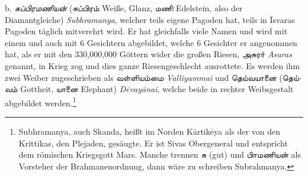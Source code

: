 \documentclass{article}
\newcommand{\TamilText}[1]{\texttamil{#1}}
\newcommand{\TamilItalic}[1]{\texttamil{\emph{#1}}}
\newcommand{\TamilHead}[1]{\TamilItalic{#1}}
\newcommand{\TamilEtymon}[1]{\TamilText{#1}}
\newcommand{\Translit}[1]{\emph{#1}}
\begin{document}
{b. \TamilHead{சுப்பிரமணியன்} (\TamilEtymon{சுப்பிரம்} Weiße, Glanz, \TamilEtymon{மணி} Edelstein, also der Diamantgleiche) \Translit{Subhramanya}, welcher teils eigene Pagoden hat, teils in \={I}svaras Pagoden täglich mitverehrt wird. Er hat gleichfalls viele Namen und wird mit einem und auch mit 6 Gesichtern abgebildet, welche 6 Gesichter er angenommen hat, als er mit den 330,000,000 Göttern wider die großen Riesen, \TamilEtymon{அசுரா்} \Translit{Asuras} genannt, in Krieg zog und dies ganze Riesengeschlecht ausrottete. Es werden ihm zwei Weiber zugeschrieben als \TamilEtymon{வள்ளியம்மை} \Translit{Valliyammai} und \TamilEtymon{தெய்வயானை} (\TamilEtymon{தெய்வம்} Gottheit, \TamilEtymon{யானை} Elephant) \Translit{D\={e}vay\={a}nai}, welche beide in rechter Weibsgestalt abgebildet werden.\footnote{Subhramanya, auch Skanda, heißt im Norden K\={a}rtik\={e}ya als der von den Krittikas, den Plejaden, gesäugte. Er ist Sivas Obergeneral und entspricht dem römischen Kriegsgott Mars. Manche trennen \TamilEtymon{சு} (gut) und \TamilEtymon{பிாமணியன்} als Vorsteher der Brahmanenordnung, dann wäre zu schreiben Subrahmanya.}

\bigskip

}
\end{document}
